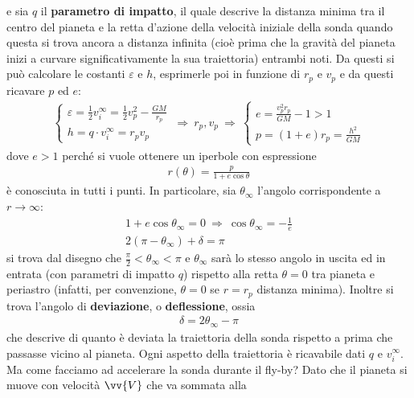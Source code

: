 \documentclass[a4paper, oneside]{book}
\begin{document}
e sia $q$ il \textbf{parametro di impatto}, il quale descrive la distanza minima tra il centro del pianeta e la retta d'azione della velocità iniziale della sonda quando questa si trova ancora a distanza infinita (cioè prima che la gravità del pianeta inizi a curvare significativamente la sua traiettoria)
entrambi noti. Da questi si può calcolare le costanti $\varepsilon$ e $h$, esprimerle poi 
in funzione di $r_p$ e $v_p$ e da questi ricavare $p$ ed $e$: 
\begin{gather*}
    \left\{\begin{array}{l}
        \displaystyle \varepsilon = \frac{1}{2} v_i^{\infty } = \frac{1}{2}v_p^{2} - \frac{GM}{r_p} \\
        \displaystyle h = q \cdot v_i^{\infty } = r_p v_p 
    \end{array}\right. \ \Longrightarrow \ r_p, v_p \ \Longrightarrow \ \left\{\begin{array}{l}
        \displaystyle e = \frac{v_p^{2} r_p}{GM} - 1 > 1 \\
        \displaystyle p = (1 + e) r_p = \frac{h^{2}}{GM}
    \end{array}\right.
\end{gather*}
dove $e > 1$ perché si vuole ottenere un iperbole con espressione 
\begin{gather*}
    r(\theta) =  \frac{p}{1 + e\cos\theta}
\end{gather*}
è conosciuta in tutti i punti. In particolare, sia $\theta_\infty$ 
l'angolo corrispondente a $r \to \infty $: 
\begin{gather*}
    1 + e \cos\theta_\infty = 0 \ \Longrightarrow \ \cos\theta_\infty = - \frac{1}{e} \\
    2(\pi - \theta_\infty ) + \delta = \pi
\end{gather*}
si trova dal disegno che $\frac{\pi}{2} < \theta_\infty < \pi$ e $\theta_\infty $ sarà lo stesso 
angolo in uscita ed in entrata (con parametri di impatto $q$) rispetto 
alla retta $\theta = 0$ tra pianeta e periastro (infatti, per convenzione, 
$\theta = 0$ se $r = r_p$ distanza minima). Inoltre si trova l'angolo 
di \textbf{deviazione}, o \textbf{deflessione}, ossia
\begin{gather*}
    \delta = 2\theta_\infty - \pi
\end{gather*}
che descrive di quanto è deviata la traiettoria della sonda rispetto a prima 
che passasse vicino al pianeta. Ogni aspetto della traiettoria è ricavabile dati $q$ e $v_i^{\infty }$. Ma 
come facciamo ad accelerare la sonda durante il fly-by? Dato che il pianeta si muove con velocità $\vv{V}$ che va sommata alla 
\end{document}
